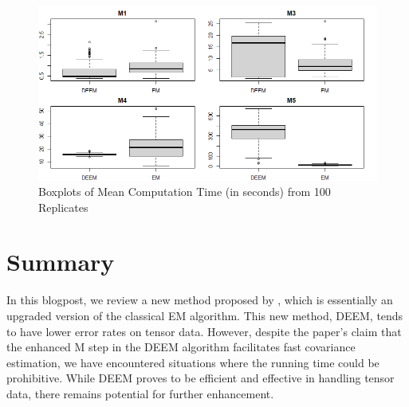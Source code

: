 \documentclass[11pt]{article}
\begin{document}
\begin{figure}[H]
    \centering
    \includegraphics[width = 16 cm]{sim_time.png}
    \caption{Boxplots of Mean Computation Time (in seconds) from 100 Replicates}
    \label{fig:time}
\end{figure}




\section{Summary}

In this blogpost, we review a new method proposed by \cite{mai2022DEEM}, which is essentially an upgraded version of the classical EM algorithm. This new method, DEEM, tends to have lower error rates on tensor data. However, despite the paper's claim that the enhanced M step in the DEEM algorithm facilitates fast covariance estimation, we have encountered situations where the running time could be prohibitive. While DEEM proves to be efficient and effective in handling tensor data, there remains potential for further enhancement.

\begin{singlespace}
	
	
\end{singlespace}
\end{document}
